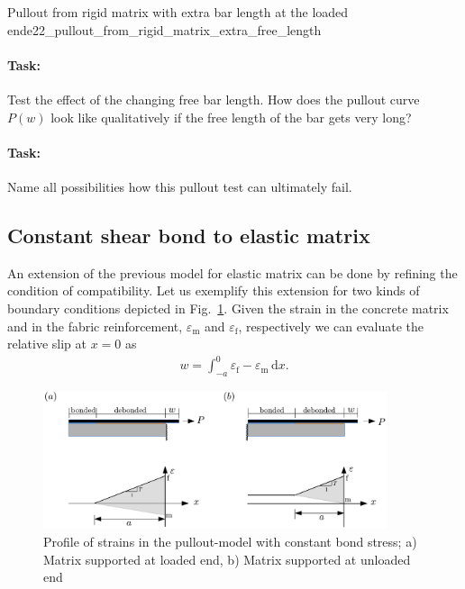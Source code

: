 \documentclass[main.tex]{subfiles}
\begin{document}
\begin{bmcsex}{Pullout from rigid matrix with extra bar length at the loaded end}{e22_pullout_from_rigid_matrix_extra_free_length}
\paragraph{Task:} Test the effect of the changing free bar length. How does the pullout curve $P(w)$ look like qualitatively if the free length of the bar gets very long? 

\paragraph{Task:} Name all possibilities how this pullout test can ultimately fail.

\end{bmcsex}

%

\subsection{Constant shear bond to elastic matrix}


An extension of the previous model for elastic matrix can be done by refining the condition of compatibility.  
Let us exemplify this extension for two kinds of boundary conditions depicted in Fig.~\ref{fig_pull-out_em}.
\label{SEC:PullOutAnalyticalElasticMatrix}
Given the strain in the concrete matrix and in the fabric reinforcement, $\varepsilon_\mathrm{m}$ and $\varepsilon_\mathrm{f}$, respectively we can evaluate the relative slip at $x = 0 $ as
\begin{align}
    w = \int_{-a}^{0} \varepsilon_\mathrm{f} - \varepsilon_\mathrm{m} \, \mathrm{d}x.  
\end{align}

\begin{figure}[ht]
	\centering
  \includegraphics[width=0.9\textwidth]{fig/pull-out_em.pdf}
	\caption{Profile of strains in the pullout-model with constant bond stress; a) Matrix supported at loaded end, b) Matrix supported at unloaded end}
	\label{fig_pull-out_em}
\end{figure}
\end{document}
